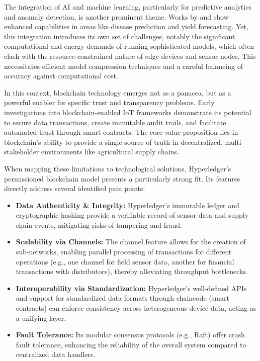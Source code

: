 \documentclass[12pt,onecolumn]{IEEEtran} %
\begin{document}
The integration of AI and machine learning, particularly for predictive analytics and anomaly detection, is another prominent theme. Works by \cite{bakthavatchalam2022iotframeworkfor} and \cite{ouafiq2022datamanagementand} show enhanced capabilities in areas like disease prediction and yield forecasting. Yet, this integration introduces its own set of challenges, notably the significant computational and energy demands of running sophisticated models, which often clash with the resource-constrained nature of edge devices and sensor nodes. This necessitates efficient model compression techniques and a careful balancing of accuracy against computational cost.

In this context, blockchain technology emerges not as a panacea, but as a powerful enabler for specific trust and transparency problems. Early investigations into blockchain-enabled IoT frameworks \cite{quy2022iotenabledsmartagriculture, abunadi2022trafficawaresecuredcooperative} demonstrate its potential to secure data transactions, create immutable audit trails, and facilitate automated trust through smart contracts. The core value proposition lies in blockchain's ability to provide a single source of truth in decentralized, multi-stakeholder environments like agricultural supply chains.

When mapping these limitations to technological solutions, Hyperledger's permissioned blockchain model presents a particularly strong fit. Its features directly address several identified pain points:
\begin{itemize}
    \item \textbf{Data Authenticity \& Integrity:} Hyperledger's immutable ledger and cryptographic hashing provide a verifiable record of sensor data and supply chain events, mitigating risks of tampering and fraud.
    \item \textbf{Scalability via Channels:} The channel feature allows for the creation of sub-networks, enabling parallel processing of transactions for different operations (e.g., one channel for field sensor data, another for financial transactions with distributors), thereby alleviating throughput bottlenecks.
    \item \textbf{Interoperability via Standardization:} Hyperledger's well-defined APIs and support for standardized data formats through chaincode (smart contracts) can enforce consistency across heterogeneous device data, acting as a unifying layer.
    \item \textbf{Fault Tolerance:} Its modular consensus protocols (e.g., Raft) offer crash fault tolerance, enhancing the reliability of the overall system compared to centralized data handlers.
\end{itemize}
\end{document}
